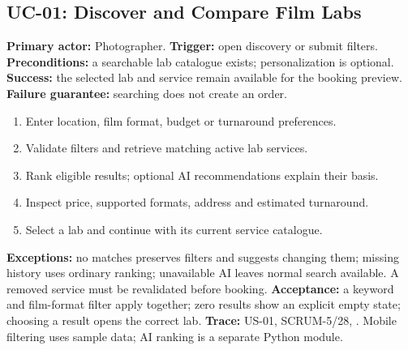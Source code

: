 \subsection{UC-01: Discover and Compare Film Labs}
\textbf{Primary actor:} Photographer. \textbf{Trigger:} open discovery or submit filters.
\textbf{Preconditions:} a searchable lab catalogue exists; personalization is
optional. \textbf{Success:} the selected lab and service remain available for
the booking preview. \textbf{Failure guarantee:} searching does not create an order.
\begin{enumerate}
\item Enter location, film format, budget or turnaround preferences.
\item Validate filters and retrieve matching active lab services.
\item Rank eligible results; optional AI recommendations explain their basis.
\item Inspect price, supported formats, address and estimated turnaround.
\item Select a lab and continue with its current service catalogue.
\end{enumerate}
\textbf{Exceptions:} no matches preserves filters and suggests changing them;
missing history uses ordinary ranking; unavailable AI leaves normal search
available. A removed service must be revalidated before booking.
\textbf{Acceptance:} a keyword and film-format filter apply together; zero results
show an explicit empty state; choosing a result opens the correct lab.
\textbf{Trace:} US-01, SCRUM-5/28, .
Mobile filtering uses sample data; AI ranking is a separate Python module.

